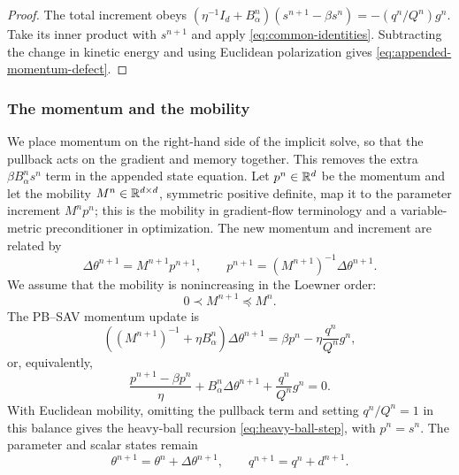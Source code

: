 \begin{proof}
The total increment obeys
\((\eta^{-1}I_d+B_\alpha^n)(s^{n+1}-\beta s^n)=-(q^n/Q^n)g^n\).
Take its inner product with \(s^{n+1}\) and apply
\cref{eq:common-identities}. Subtracting the change in kinetic energy and
using Euclidean polarization gives \cref{eq:appended-momentum-defect}.
\end{proof}

\subsubsection{The momentum and the mobility}

We place momentum on the right-hand side of the implicit solve, so that the
pullback acts on the gradient and memory together. This removes the extra
\(\beta B_\alpha^n s^n\) term in the appended state equation.
Let \(p^n\in\mathbb{R}^d\) be the momentum and let the mobility
\(M^n\in\mathbb{R}^{d\times d}\), symmetric positive definite, map it to the
parameter increment \(M^np^n\); this is the mobility in gradient-flow
terminology and a variable-metric preconditioner in optimization. The new
momentum and increment are related by
\begin{equation}
  \Delta\theta^{n+1}=M^{n+1}p^{n+1},
  \qquad
  p^{n+1}=(M^{n+1})^{-1}\Delta\theta^{n+1}.
  \label{eq:covector-map}
\end{equation}
We assume that the mobility is nonincreasing in the Loewner order:
\begin{equation}
  0\prec M^{n+1}\preceq M^n.
  \label{eq:abstract-mobility-order}
\end{equation}
The PB--SAV momentum update is
\begin{equation}
  \left((M^{n+1})^{-1}+\eta B_\alpha^n\right)
  \Delta\theta^{n+1}
  =\beta p^n-\eta\frac{q^n}{Q^n}g^n,
  \label{eq:abstract-momentum-step}
\end{equation}
or, equivalently,
\begin{equation}
  \frac{p^{n+1}-\beta p^n}{\eta}
  +B_\alpha^n\Delta\theta^{n+1}
  +\frac{q^n}{Q^n}g^n=0.
  \label{eq:abstract-momentum-balance}
\end{equation}
With Euclidean mobility, omitting the pullback term and setting \(q^n/Q^n=1\)
in this balance gives the heavy-ball recursion \cref{eq:heavy-ball-step},
with \(p^n=s^n\).
The parameter and scalar states remain
\begin{equation}
  \theta^{n+1}=\theta^n+\Delta\theta^{n+1},
  \qquad
  q^{n+1}=q^n+d^{n+1}.
  \label{eq:abstract-momentum-states}
\end{equation}

